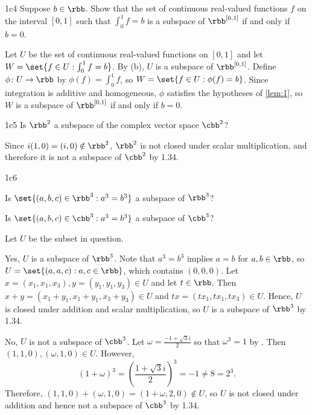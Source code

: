\begin{exercise}{1c4}
    Suppose $b \in \rbb$.
	Show that the set of continuous real-valued functions $f$ on the interval $[0, 1]$ such that $\int_0^1 f = b$ is a subspace of $\rbb^{[0, 1]}$ if and only if $b = 0$.
\end{exercise}

\begin{sol}
    Let $U$ be the set of continuous real-valued functions on $[0, 1]$ and let $W = \set{f \in U : \int_0^1 f = b}$.
    By (b), $U$ is a subspace of $\rbb^{[0, 1]}$. 
    Define $\phi \colon U \to \rbb$ by $\phi(f) = \int_0^1 f$, so $W = \set{f \in U : \phi(f) = b}$.
    Since integration is additive and homogeneous, $\phi$ satisfies the hypotheses of \autoref{lem:1}, so $W$ is a subspace of $\rbb^{[0, 1]}$ if and only if $b = 0$.
\end{sol}

\begin{exercise}{1c5}
    Is $\rbb^2$ a subspace of the complex vector space $\cbb^2$?
\end{exercise}

\begin{sol}
    Since $i(1, 0) = (i, 0) \notin \rbb^2$, $\rbb^2$ is not closed under scalar multiplication, and therefore it is not a subspace of $\cbb^2$ by 1.34.
\end{sol}

\begin{exercise}{1c6}
    \begin{subexercises}
        \item Is $\set{(a, b, c) \in \rbb^3 : a^3 = b^3}$ a subspace of $\rbb^3$?
        \item Is $\set{(a, b, c) \in \cbb^3 : a^3 = b^3}$ a subspace of $\cbb^3$?
    \end{subexercises}
\end{exercise}

\begin{sol}
    Let $U$ be the subset in question.
    \begin{subexercises}
        \item Yes, $U$ is a subspace of $\rbb^3$.
        Note that $a^3 = b^3$ implies $a = b$ for $a, b \in \rbb$, so $U = \set{(a, a, c) : a, c \in \rbb}$, which contains $(0, 0, 0)$.
        Let $x = (x_1, x_1, x_3), y = (y_1, y_1, y_3) \in U$ and let $t \in \rbb$.
        Then $x + y = (x_1 + y_1, x_1 + y_1, x_3 + y_3) \in U$ and $tx = (tx_1, tx_1, tx_3) \in U$.
        Hence, $U$ is closed under addition and scalar multiplication, so $U$ is a subspace of $\rbb^3$ by 1.34.
        \item No, $U$ is not a subspace of $\cbb^3$.
        Let $\omega = \frac{-1 + \sqrt{3}i}{2}$ so that $\omega^3 = 1$ by .
        Then $(1, 1, 0), (\omega, 1, 0) \in U$.
        However,
        \[
            (1 + \omega)^3 = \left(\frac{1 + \sqrt{3}i}{2}\right)^3 = -1 \neq 8 = 2^3.
        \]
        Therefore, $(1, 1, 0) + (\omega, 1, 0) = (1 + \omega, 2, 0) \notin U$, so $U$ is not closed under addition and hence not a subspace of $\cbb^3$ by 1.34. \qedhere
    \end{subexercises}
\end{sol}

